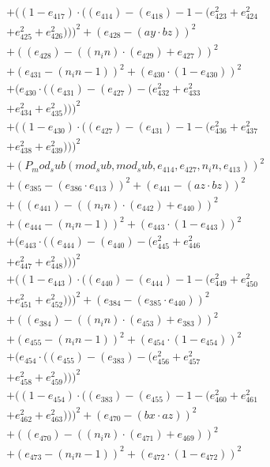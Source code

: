 \documentclass[10pt, a4paper]{article}
\begin{document}
\begin{align*}
& + ((1 - e_{417})  \cdot  ((e_{414}) - (e_{418}) - 1 - (e_{423}^{2} + e_{424}^{2} \\
& + e_{425}^{2} + e_{426}^{2})))^{2} + (e_{428} - (ay  \cdot  bz))^{2} \\
& + ((e_{428}) - ((n_in)  \cdot  (e_{429}) + e_{427}))^{2} \\
& + (e_{431} - (n_in - 1))^{2} + (e_{430}  \cdot  (1 - e_{430}))^{2} \\
& + (e_{430}  \cdot  ((e_{431}) - (e_{427}) - (e_{432}^{2} + e_{433}^{2} \\
& + e_{434}^{2} + e_{435}^{2})))^{2} \\
& + ((1 - e_{430})  \cdot  ((e_{427}) - (e_{431}) - 1 - (e_{436}^{2} + e_{437}^{2} \\
& + e_{438}^{2} + e_{439}^{2})))^{2} \\
& + (P_mod_sub(mod_sub, mod_sub, e_{414}, e_{427}, n_in, e_{413}))^{2} \\
& + (e_{385} - (e_{386}  \cdot  e_{413}))^{2} + (e_{441} - (az  \cdot  bz))^{2} \\
& + ((e_{441}) - ((n_in)  \cdot  (e_{442}) + e_{440}))^{2} \\
& + (e_{444} - (n_in - 1))^{2} + (e_{443}  \cdot  (1 - e_{443}))^{2} \\
& + (e_{443}  \cdot  ((e_{444}) - (e_{440}) - (e_{445}^{2} + e_{446}^{2} \\
& + e_{447}^{2} + e_{448}^{2})))^{2} \\
& + ((1 - e_{443})  \cdot  ((e_{440}) - (e_{444}) - 1 - (e_{449}^{2} + e_{450}^{2} \\
& + e_{451}^{2} + e_{452}^{2})))^{2} + (e_{384} - (e_{385}  \cdot  e_{440}))^{2} \\
& + ((e_{384}) - ((n_in)  \cdot  (e_{453}) + e_{383}))^{2} \\
& + (e_{455} - (n_in - 1))^{2} + (e_{454}  \cdot  (1 - e_{454}))^{2} \\
& + (e_{454}  \cdot  ((e_{455}) - (e_{383}) - (e_{456}^{2} + e_{457}^{2} \\
& + e_{458}^{2} + e_{459}^{2})))^{2} \\
& + ((1 - e_{454})  \cdot  ((e_{383}) - (e_{455}) - 1 - (e_{460}^{2} + e_{461}^{2} \\
& + e_{462}^{2} + e_{463}^{2})))^{2} + (e_{470} - (bx  \cdot  az))^{2} \\
& + ((e_{470}) - ((n_in)  \cdot  (e_{471}) + e_{469}))^{2} \\
& + (e_{473} - (n_in - 1))^{2} + (e_{472}  \cdot  (1 - e_{472}))^{2} \\

\end{align*}
\end{document}
